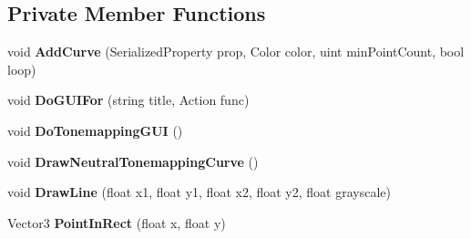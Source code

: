 \subsection*{Private Member Functions}
\begin{DoxyCompactItemize}
\item 
\mbox{\label{class_unity_editor_1_1_post_processing_1_1_color_grading_model_editor_a6a155a500587d1375dfe4b999f8e1110}} 
void {\bfseries Add\+Curve} (Serialized\+Property prop, Color color, uint min\+Point\+Count, bool loop)
\item 
\mbox{\label{class_unity_editor_1_1_post_processing_1_1_color_grading_model_editor_ad308784858d913a248bfad7c1589f2f2}} 
void {\bfseries Do\+G\+U\+I\+For} (string title, Action func)
\item 
\mbox{\label{class_unity_editor_1_1_post_processing_1_1_color_grading_model_editor_a879a95a03c66bd33ad29292184bece50}} 
void {\bfseries Do\+Tonemapping\+G\+UI} ()
\item 
\mbox{\label{class_unity_editor_1_1_post_processing_1_1_color_grading_model_editor_ae93319f337bd49aea677729ec4d1b575}} 
void {\bfseries Draw\+Neutral\+Tonemapping\+Curve} ()
\item 
\mbox{\label{class_unity_editor_1_1_post_processing_1_1_color_grading_model_editor_a4d3b36da5a557e7778c40c6142a8aa20}} 
void {\bfseries Draw\+Line} (float x1, float y1, float x2, float y2, float grayscale)
\item 
\mbox{\label{class_unity_editor_1_1_post_processing_1_1_color_grading_model_editor_aa99e05d459fbb9fc5686eba1c732d878}} 
Vector3 {\bfseries Point\+In\+Rect} (float x, float y)
\item 
\mbox{\label{class_unity_editor_1_1_post_processing_1_1_color_grading_model_editor_aa438674a84e1b555e4b1354a021e948e}} 

\end{DoxyCompactItemize}
